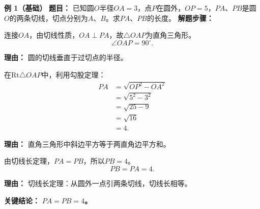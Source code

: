 \begin{examplebox}
	\textbf{\textcolor{CExample}{例 1（基础）}}
	\textbf{\textcolor{CExample}{题目：}}
	已知圆$O$半径$OA=3$，点$P$在圆外，$OP=5$，$PA$、$PB$是圆$O$的两条切线，切点分别为$A$、$B$。求$PA$、$PB$的长度。
	\textbf{\textcolor{CExample}{解题步骤：}}
	\begin{description}[style=nextline, leftmargin=2.8em, labelsep=0.5em, itemsep=0.45em]
		\item[\textbf{第一步（垂直条件）：}]
			连接$OA$，由切线性质，$OA\perp PA$，故$\triangle OAP$为直角三角形。
			\[
				\angle OAP = 90^\circ.
			\]
			\par\textbf{理由：} 圆的切线垂直于过切点的半径。
		\item[\textbf{第二步（勾股计算）：}]
			在$\mathrm{Rt}\triangle OAP$中，利用勾股定理：
			\[
				\begin{aligned}
					PA &= \sqrt{OP^2 - OA^2} \\ &= \sqrt{5^2 - 3^2} \\ &= \sqrt{25-9} \\ &= \sqrt{16} \\ &= 4.
			\end{aligned}
			\]
			\par\textbf{理由：} 直角三角形中斜边平方等于两直角边平方和。
		\item[\textbf{第三步（使用定理）：}]
			由切线长定理，$PA = PB$，所以$PB = 4$。
			\[
				PB = PA = 4.
			\]
			\par\textbf{理由：} 切线长定理：从圆外一点引两条切线，切线长相等。
	\end{description}
	\textbf{\textcolor{CExample}{关键结论：}}
	\textbf{$PA = PB = 4$。}


\end{examplebox}
